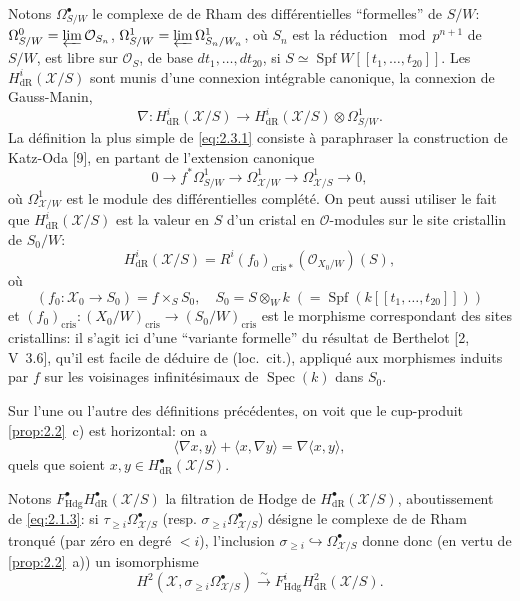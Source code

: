 \documentclass[12pt,a4paper]{article}
\theoremstyle{plain}
\theoremstyle{definition}
\theoremstyle{remark}
\DeclareMathOperator{\Spf}{Spf}
\DeclareMathOperator{\Spec}{Spec}
\newcommand{\Hdg}{\mathrm{Hdg}}
\newcommand{\cris}{\mathrm{cris}}
\begin{document}
Notons $\Omega_{S/W}^{\bullet}$ le complexe de de Rham des différentielles ``formelles'' de $S/W$: $\Omega_{S/W}^{0} = \varprojlim \mathcal{O}_{S_n}$, $\Omega_{S/W}^{1} = \varprojlim \Omega^1_{S_n/W_n}$, où $S_n$ est la réduction $\bmod p^{n+1}$ de $S/W$, est libre sur $\mathcal{O}_S$, de base $dt_1, \ldots, dt_{20}$, si $S \simeq \Spf W[[t_1, \ldots, t_{20}]]$. Les $H^i_{\mathrm{dR}}(\mathcal{X}/S)$ sont munis d'une connexion intégrable canonique, la connexion de Gauss-Manin,
\begin{equation}\label{eq:2.3.1}
\nabla: H^i_{\mathrm{dR}}(\mathcal{X}/S) \to H^i_{\mathrm{dR}}(\mathcal{X}/S) \otimes \Omega^1_{S/W}.
\end{equation}
La définition la plus simple de \eqref{eq:2.3.1} consiste à paraphraser la construction de Katz-Oda [9], en partant de l'extension canonique
\begin{equation}\label{eq:2.3.0}
0 \to f^*\Omega^1_{S/W} \to \Omega^1_{\mathcal{X}/W} \to \Omega^1_{\mathcal{X}/S} \to 0,
\end{equation}
où $\Omega^1_{\mathcal{X}/W}$ est le module des différentielles complété. On peut aussi utiliser le fait que $H^i_{\mathrm{dR}}(\mathcal{X}/S)$ est la valeur en $S$ d'un cristal en $\mathcal{O}$-modules sur le site cristallin de $S_0/W$:
\begin{equation}\label{eq:2.3.2}
H^i_{\mathrm{dR}}(\mathcal{X}/S) = R^i(f_0)_{\cris*}(\mathcal{O}_{X_0/W})(S),
\end{equation}
où
\begin{equation}\label{eq:2.3.2.1}
(f_0: \mathcal{X}_0 \to S_0) = f \times_S S_0, \quad S_0 = S \otimes_W k \; (= \Spf(k[[t_1, \ldots, t_{20}]]))
\end{equation}
et $(f_0)_{\cris}: (X_0/W)_{\cris} \to (S_0/W)_{\cris}$ est le morphisme correspondant des sites cristallins: il s'agit ici d'une ``variante formelle'' du résultat de Berthelot [2, V~3.6], qu'il est facile de déduire de (loc.~cit.), appliqué aux morphismes induits par $f$ sur les voisinages infinitésimaux de $\Spec(k)$ dans $S_0$.

Sur l'une ou l'autre des définitions précédentes, on voit que le cup-produit \ref{prop:2.2}~c) est horizontal: on a
\begin{equation}\label{eq:2.3.3}
\langle \nabla x, y \rangle + \langle x, \nabla y \rangle = \nabla \langle x, y \rangle,
\end{equation}
quels que soient $x, y \in H^{\bullet}_{\mathrm{dR}}(\mathcal{X}/S)$.

Notons $F^{\bullet}_{\Hdg} H^{\bullet}_{\mathrm{dR}}(\mathcal{X}/S)$ la filtration de Hodge de $H^{\bullet}_{\mathrm{dR}}(\mathcal{X}/S)$, aboutissement de \eqref{eq:2.1.3}: si $\tau_{\geqslant i} \Omega_{\mathcal{X}/S}^{\bullet}$ (resp. $\sigma_{\geqslant i} \Omega_{\mathcal{X}/S}^{\bullet}$) désigne le complexe de de Rham tronqué (par zéro en degré $< i$), l'inclusion $\sigma_{\geqslant i} \hookrightarrow \Omega_{\mathcal{X}/S}^{\bullet}$ donne donc (en vertu de \ref{prop:2.2}~a)) un isomorphisme
\begin{equation}\label{eq:2.3.4}
H^2(\mathcal{X}, \sigma_{\geqslant i} \Omega_{\mathcal{X}/S}^{\bullet}) \xrightarrow{\sim} F^i_{\Hdg} H^2_{\mathrm{dR}}(\mathcal{X}/S).
\end{equation}
\end{document}
